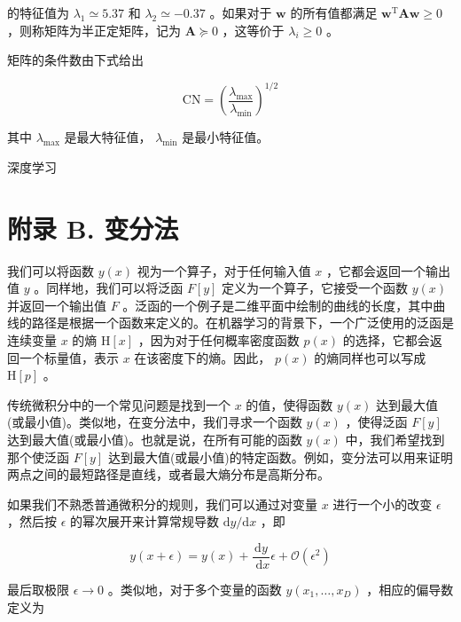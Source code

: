 \documentclass[10pt]{article}
\begin{document}
的特征值为 \({\lambda }_{1} \simeq  {5.37}\) 和 \({\lambda }_{2} \simeq   - {0.37}\) 。如果对于 \(\mathbf{w}\) 的所有值都满足 \({\mathbf{w}}^{\mathrm{T}}\mathbf{{Aw}} \geq  0\) ，则称矩阵为半正定矩阵，记为 \(\mathbf{A} \succcurlyeq  0\) ，这等价于 \({\lambda }_{i} \geq  0\) 。

矩阵的条件数由下式给出

\[
\mathrm{{CN}} = {\left( \frac{{\lambda }_{\max }}{{\lambda }_{\min }}\right) }^{1/2} \tag{A.50}
\]

其中 \({\lambda }_{\max }\) 是最大特征值， \({\lambda }_{\min }\) 是最小特征值。

深度学习

\section*{附录 B. 变分法}

我们可以将函数 \(y\left( x\right)\) 视为一个算子，对于任何输入值 \(x\) ，它都会返回一个输出值 \(y\) 。同样地，我们可以将泛函 \(F\left\lbrack  y\right\rbrack\) 定义为一个算子，它接受一个函数 \(y\left( x\right)\) 并返回一个输出值 \(F\) 。泛函的一个例子是二维平面中绘制的曲线的长度，其中曲线的路径是根据一个函数来定义的。在机器学习的背景下，一个广泛使用的泛函是连续变量 \(x\) 的熵 \(\mathrm{H}\left\lbrack  x\right\rbrack\) ，因为对于任何概率密度函数 \(p\left( x\right)\) 的选择，它都会返回一个标量值，表示 \(x\) 在该密度下的熵。因此， \(p\left( x\right)\) 的熵同样也可以写成 \(\mathrm{H}\left\lbrack  p\right\rbrack\) 。

传统微积分中的一个常见问题是找到一个 \(x\) 的值，使得函数 \(y\left( x\right)\) 达到最大值(或最小值)。类似地，在变分法中，我们寻求一个函数 \(y\left( x\right)\) ，使得泛函 \(F\left\lbrack  y\right\rbrack\) 达到最大值(或最小值)。也就是说，在所有可能的函数 \(y\left( x\right)\) 中，我们希望找到那个使泛函 \(F\left\lbrack  y\right\rbrack\) 达到最大值(或最小值)的特定函数。例如，变分法可以用来证明两点之间的最短路径是直线，或者最大熵分布是高斯分布。

如果我们不熟悉普通微积分的规则，我们可以通过对变量 \(x\) 进行一个小的改变 \(\epsilon\) ，然后按 \(\epsilon\) 的幂次展开来计算常规导数 \(\mathrm{d}y/\mathrm{d}x\) ，即

\[
y\left( {x + \epsilon }\right)  = y\left( x\right)  + \frac{\mathrm{d}y}{\mathrm{\;d}x}\epsilon  + \mathcal{O}\left( {\epsilon }^{2}\right)  \tag{B.1}
\]

最后取极限 \(\epsilon  \rightarrow  0\) 。类似地，对于多个变量的函数 \(y\left( {{x}_{1},\ldots ,{x}_{D}}\right)\) ，相应的偏导数定义为
\end{document}
